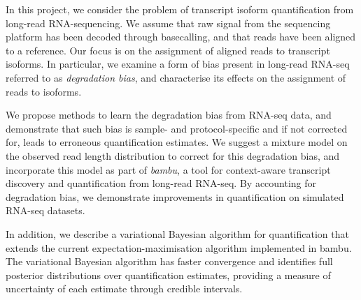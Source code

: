 In this project, we consider the problem of transcript isoform quantification from long-read RNA-sequencing. We assume that raw signal from the sequencing platform has been decoded through basecalling, and that reads have been aligned to a reference. Our focus is on the assignment of aligned reads to transcript isoforms. In particular, we examine a form of bias present in long-read RNA-seq referred to as \textit{degradation bias}, and characterise its effects on the assignment of reads to isoforms. 

We propose methods to learn the degradation bias from RNA-seq data, and demonstrate that such bias is sample- and protocol-specific and if not corrected for, leads to erroneous quantification estimates. We suggest a mixture model on the observed read length distribution to correct for this degradation bias, and incorporate this model as part of \textit{bambu}, a tool for context-aware transcript discovery and quantification from long-read RNA-seq. By accounting for degradation bias, we demonstrate improvements in quantification on simulated RNA-seq datasets. 

In addition, we describe a variational Bayesian algorithm for quantification that extends the current expectation-maximisation algorithm implemented in bambu. The variational Bayesian algorithm has faster convergence and identifies full posterior distributions over quantification estimates, providing a measure of uncertainty of each estimate through credible intervals.  

